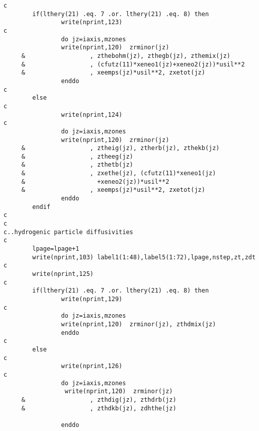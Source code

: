 \begin{verbatim}
c
        if(lthery(21) .eq. 7 .or. lthery(21) .eq. 8) then
                write(nprint,123)
c
                do jz=iaxis,mzones
                write(nprint,120)  zrminor(jz)
     &                  , zthebohm(jz), zthegb(jz), zthemix(jz)
     &                  , (cfutz(11)*xeneo1(jz)+xeneo2(jz))*usil**2
     &                  , xeemps(jz)*usil**2, zxetot(jz)
                enddo
c
        else
c
                write(nprint,124)
c
                do jz=iaxis,mzones
                write(nprint,120)  zrminor(jz)
     &                  , ztheig(jz), ztherb(jz), zthekb(jz)
     &                  , ztheeg(jz)
     &                  , zthetb(jz)
     &                  , zxethe(jz), (cfutz(11)*xeneo1(jz)
     &                    +xeneo2(jz))*usil**2
     &                  , xeemps(jz)*usil**2, zxetot(jz)
                enddo
        endif
c
c
c..hydrogenic particle diffusivities
c
        lpage=lpage+1
        write(nprint,103) label1(1:48),label5(1:72),lpage,nstep,zt,zdt
c
        write(nprint,125)
c
        if(lthery(21) .eq. 7 .or. lthery(21) .eq. 8) then
                write(nprint,129)
c
                do jz=iaxis,mzones
                write(nprint,120)  zrminor(jz), zthdmix(jz)
                enddo
c
        else
c
                write(nprint,126)
c
                do jz=iaxis,mzones
                 write(nprint,120)  zrminor(jz)
     &                  , zthdig(jz), zthdrb(jz)
     &                  , zthdkb(jz), zdhthe(jz)

                enddo


\end{verbatim}
